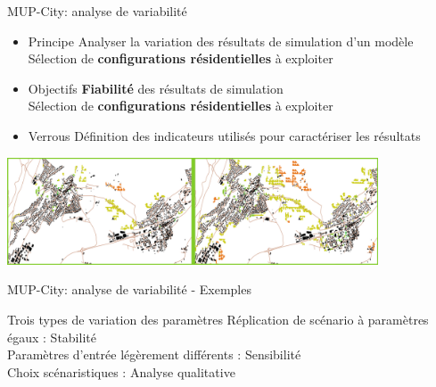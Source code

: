 \documentclass[xcolor=table]{beamer}
\begin{document}
\begin{frame}{MUP-City: analyse de variabilité}
	\begin{itemize}

		\item 	\begin{block}{Principe}
					Analyser la variation des résultats de simulation d'un modèle\\
					Sélection de \textbf{configurations résidentielles} à exploiter
				\end{block}

		\item 	\begin{block}{Objectifs}
					\textbf{Fiabilité} des résultats de simulation\\
					Sélection de \textbf{configurations résidentielles} à exploiter
				\end{block}

		\item 	\begin{block}{Verrous}
					Définition des indicateurs utilisés pour caractériser les résultats\\
				\end{block}
	\end{itemize}

	\includegraphics[width=11cm]{Images/ex-sorties-mup2.png}
\end{frame}

\begin{frame}{MUP-City: analyse de variabilité - Exemples}
	\begin{block}{Trois types de variation des paramètres}
	Réplication de scénario à paramètres égaux : \alert{Stabilité}\\
	Paramètres d'entrée légèrement différents : \alert{Sensibilité}\\
	Choix scénaristiques : \alert{Analyse qualitative}	
\end{block}
\end{frame}
\end{document}
